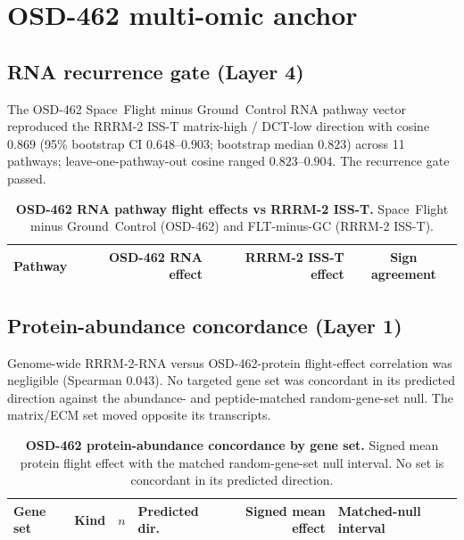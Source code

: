 \documentclass[10pt]{article}
\begin{document}
\section{OSD-462 multi-omic anchor}

\subsection{RNA recurrence gate (Layer 4)}

The OSD-462 Space~Flight minus Ground~Control RNA pathway vector reproduced the RRRM-2 ISS-T matrix-high / DCT-low direction with cosine $0.869$ (95\% bootstrap CI $0.648$--$0.903$; bootstrap median $0.823$) across 11 pathways; leave-one-pathway-out cosine ranged $0.823$--$0.904$. The recurrence gate passed.

\begin{table}[H]
\centering\small
\caption{\textbf{OSD-462 RNA pathway flight effects vs RRRM-2 ISS-T.} Space~Flight minus Ground~Control (OSD-462) and FLT-minus-GC (RRRM-2 ISS-T).}
\label{tab:rnapath}
\begin{tabular}{lrrc}
\toprule
Pathway & OSD-462 RNA effect & RRRM-2 ISS-T effect & Sign agreement \\
\midrule

\bottomrule
\end{tabular}
\end{table}

\subsection{Protein-abundance concordance (Layer 1)}

Genome-wide RRRM-2-RNA versus OSD-462-protein flight-effect correlation was negligible (Spearman $0.043$). No targeted gene set was concordant in its predicted direction against the abundance- and peptide-matched random-gene-set null. The matrix/ECM set moved opposite its transcripts.

\begin{table}[H]
\centering\small
\caption{\textbf{OSD-462 protein-abundance concordance by gene set.} Signed mean protein flight effect with the matched random-gene-set null interval. No set is concordant in its predicted direction.}
\label{tab:protconc}
\begin{tabular}{llrlrl}
\toprule
Gene set & Kind & $n$ & Predicted dir. & Signed mean effect & Matched-null interval \\
\midrule

\bottomrule
\end{tabular}
\end{table}
\end{document}

